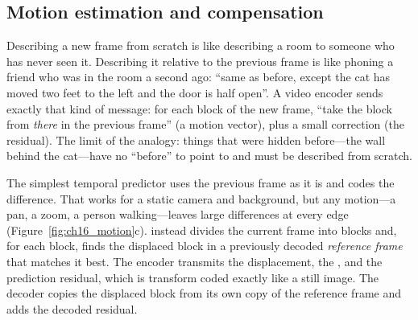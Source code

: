 \subsection{Motion estimation and compensation}


\begin{analogy}
Describing a new frame from scratch is like describing a room to someone who has never seen it.
Describing it relative to the previous frame is like phoning a friend who was in the room a second
ago: ``same as before, except the cat has moved two feet to the left and the door is half open''.
A video encoder sends exactly that kind of message: for each block of the new frame, ``take the
block from \emph{there} in the previous frame'' (a motion vector), plus a small correction (the
residual). The limit of the analogy: things that were hidden before---the wall behind the cat---have
no ``before'' to point to and must be described from scratch.
\end{analogy}

The simplest temporal predictor uses the previous frame as it is and codes the difference. That works
for a static camera and background, but any motion---a pan, a zoom, a person walking---leaves large
differences at every edge (Figure~\ref{fig:ch16_motion}c). 
instead divides the current frame into blocks and, for each block, finds the displaced block in a
previously decoded \emph{reference frame} that matches it best. The encoder transmits the displacement,
the , and the prediction residual, which is transform coded exactly like a still
image. The decoder copies the displaced block from its own copy of the reference frame and adds the
decoded residual.


